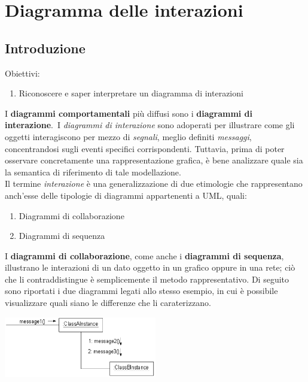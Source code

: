 \documentclass{article}
\begin{document}
\pagestyle{empty}

\section*{Diagramma delle interazioni}
\large
\subsection*{Introduzione}
Obiettivi:
\begin{enumerate}
    \renewcommand{\labelenumi}{-}
    \item Riconoscere e saper interpretare un diagramma di interazioni
\end{enumerate}
I \textbf{diagrammi comportamentali} più diffusi sono i \textbf{diagrammi di interazione}.\ I \textit{diagrammi di interazione} sono adoperati per illustrare come gli oggetti interagiscono per mezzo di \textit{segnali}, meglio definiti \textit{messaggi}, concentrandosi sugli eventi specifici corrispondenti. Tuttavia, prima di poter osservare concretamente una rappresentazione grafica, è bene analizzare quale sia la semantica di riferimento di tale modellazione.\vspace*{14pt}\\
Il termine \textit{interazione} è una generalizzazione di due etimologie che rappresentano anch'esse delle tipologie di diagrammi appartenenti a UML, quali:
\begin{enumerate}
    \renewcommand{\labelenumi}{-}
    \itemsep0em
    \item Diagrammi di collaborazione
    \item Diagrammi di sequenza
\end{enumerate}
I \textbf{diagrammi di collaborazione}, come anche i \textbf{diagrammi di sequenza}, illustrano le interazioni di un dato oggetto in un grafico oppure in una rete; ciò che li contraddistingue è semplicemente il metodo rappresentativo. Di seguito sono riportati i due diagrammi legati allo stesso esempio, in cui è possibile visualizzare quali siano le differenze che li caraterizzano.\vspace*{14pt}
\begin{center}
    \includegraphics[width=0.5\textwidth]{foto 1.png}
\end{center}
\end{document}
